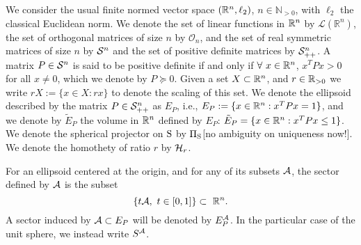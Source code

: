 We consider the usual finite normed vector space $(\mathbb{R}^n,\ell_2)$, $n \in \mathbb{N}_{> 0}$, with $\ell_2$ the classical Euclidean norm. We denote the set of linear functions in $\mathbb{R}^n$ by $\mathcal{L}(\mathbb{R}^n)$, the set of orthogonal matrices of size $n$ by $\mathcal{O}_n$, and the set of real symmetric matrices of size $n$ by $\mathcal{S}^n$ and the set of positive definite matrices by $\mathcal{S}^n_{++}$. A matrix $P \in \mathcal{S}^n$ is said to be positive definite if and only if $\forall\ x \in \mathbb{R}^n$, $x^TPx > 0$ for all $x \not = 0$, which we denote by $P \succeq 0$. Given a set $X \subset \mathbb{R}^n$, and $r \in \mathbb{R}_{> 0}$ we write $rX := \{x \in X : rx\}$ to denote the scaling of this set. We denote the ellipsoid described by the matrix $P \in \mathcal{S}^n_{++}$ as $E_P$, i.e., $E_P:= \{x \in \mathbb{R}^n: x^TPx = 1\}$, and we denote by $\tilde{E}_P$ the volume in $\mathbb{R}^n$ defined by $E_P$: $\tilde{E}_P = \{x \in \mathbb{R}^n: x^TPx \leq 1\}$. We denote the spherical projector on $\text{S}$ by $\Pi_{\text{S}}$[no ambiguity on uniqueness now!]. We denote the homothety of ratio $r$ by $\mathcal{H}_{r}$. 


For an ellipsoid centered at the origin, and for any of its subsets $\mathcal{A}$, the sector defined by $\mathcal{A}$ is the subset $$\{t \calA, \ t \in [0,1]\} \subset\ \R^n.$$ A sector induced by $\mathcal{A} \subset E_P$ will be denoted by $E_P^{\mathcal{A}}$. In the particular case of the unit sphere, we instead write $S^{\mathcal{A}}$.

